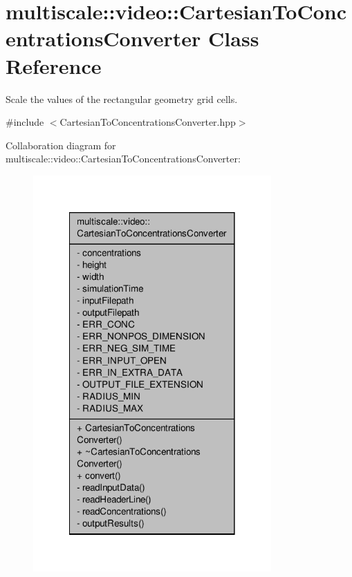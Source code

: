 \hypertarget{classmultiscale_1_1video_1_1CartesianToConcentrationsConverter}{\section{multiscale\-:\-:video\-:\-:Cartesian\-To\-Concentrations\-Converter Class Reference}
\label{classmultiscale_1_1video_1_1CartesianToConcentrationsConverter}
}


Scale the values of the rectangular geometry grid cells.  




{\ttfamily \#include $<$Cartesian\-To\-Concentrations\-Converter.\-hpp$>$}



Collaboration diagram for multiscale\-:\-:video\-:\-:Cartesian\-To\-Concentrations\-Converter\-:
\nopagebreak
\begin{figure}[H]
\begin{center}
\leavevmode
\includegraphics[width=258pt]{classmultiscale_1_1video_1_1CartesianToConcentrationsConverter__coll__graph}
\end{center}
\end{figure}
